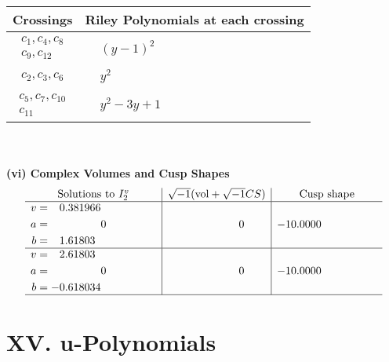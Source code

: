 \documentclass[1p]{elsarticle_modified}
\theoremstyle{definition}
\newcommand{\I}{\sqrt{-1}}
\begin{document}
\begin{tabular}{m{50pt}|m{274pt}}
Crossings & \hspace{64pt}Riley Polynomials at each crossing \\
\hline $$\begin{aligned}c_{1},c_{4},c_{8}\\c_{9},c_{12}\end{aligned}$$&$\begin{aligned}
&(y-1)^2
\end{aligned}$\\
\hline $$\begin{aligned}c_{2},c_{3},c_{6}\end{aligned}$$&$\begin{aligned}
&y^2
\end{aligned}$\\
\hline $$\begin{aligned}c_{5},c_{7},c_{10}\\c_{11}\end{aligned}$$&$\begin{aligned}
&y^2-3 y+1
\end{aligned}$\\
\hline
\end{tabular}\\~\\
\newpage\flushleft \textbf{(vi) Complex Volumes and Cusp Shapes}
$$\begin{array}{c|c|c}  
\text{Solutions to }I^v_{2}& \I (\text{vol} + \sqrt{-1}CS) & \text{Cusp shape}\\
 \hline 
\begin{aligned}
v &= \phantom{-}0.381966\phantom{ +0.000000I} \\
a &= \phantom{-0.000000 } 0 \\
b &= \phantom{-}1.61803\phantom{ +0.000000I}\end{aligned}
 & \phantom{-0.000000 } 0 & -10.0000\phantom{ +0.000000I} \\ \hline\begin{aligned}
v &= \phantom{-}2.61803\phantom{ +0.000000I} \\
a &= \phantom{-0.000000 } 0 \\
b &= -0.618034\phantom{ +0.000000I}\end{aligned}
 & \phantom{-0.000000 } 0 & -10.0000\phantom{ +0.000000I}\\
 \hline 
 \end{array}$$\newpage
\newpage\renewcommand{\arraystretch}{1}
\centering \section*{ XV. u-Polynomials}
\end{document}
